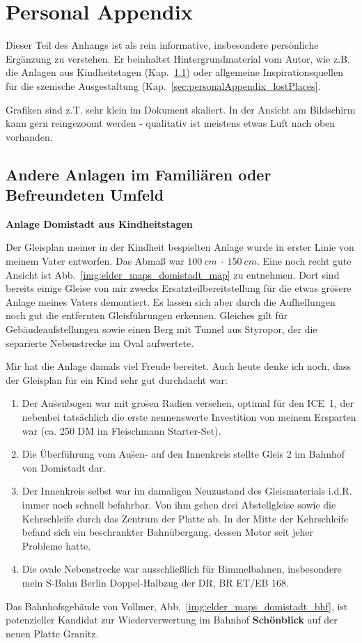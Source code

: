 \section{Personal Appendix}
\label{sec:personalAppendix}

Dieser Teil des Anhangs ist als rein informative, insbesondere pers\"onliche Erg\"anzung zu verstehen.
Er beinhaltet Hintergrundmaterial vom Autor, wie z.B. die Anlagen aus Kindheitstagen (Kap.~\ref{sec:personalAppendix_elderTracks}) oder allgemeine Inspirationsquellen f\"ur die szenische Ausgestaltung (Kap.~\ref{sec:personalAppendix_lostPlaces}.

Grafiken sind z.T. sehr klein im Dokument skaliert.
In der Ansicht am Bildschirm kann gern reingezoomt werden - qualitativ ist meistens etwas Luft nach oben vorhanden.


\subsection{Andere Anlagen im Famili\"aren oder Befreundeten Umfeld}
\label{sec:personalAppendix_elderTracks}

\textbf{Anlage Domistadt aus Kindheitstagen}

Der Gleisplan meiner in der Kindheit bespielten Anlage wurde in erster Linie von meinem Vater entworfen.
Das Abma{\ss} war $100~cm~\cdot~150~cm$.
Eine noch recht gute Ansicht ist Abb.~\ref{img:elder_maps_domistadt_map} zu entnehmen.
Dort sind bereits einige Gleise von mir zwecks Ersatzteilbereitstellung f\"ur die etwas gr\"o\"sere Anlage meines Vaters demontiert.
Es lassen sich aber durch die Aufhellungen noch gut die entfernten Gleisf\"uhrungen erkennen.
Gleiches gilt f\"ur Geb\"audeaufstellungen sowie einen Berg mit Tunnel aus Styropor, der die separierte Nebenstrecke im Oval aufwertete.

Mir hat die Anlage damals viel Freude bereitet.
Auch heute denke ich noch, dass der Gleisplan f\"ur ein Kind sehr gut durchdacht war:
\begin{enumerate}
	\item Der Au\"senbogen war mit gro\"sen Radien versehen, optimal f\"ur den ICE~1, der nebenbei tats\"achlich die erste nennenswerte Investition von meinem Ersparten war (ca. 250 DM im Fleischmann Starter-Set).
	\item Die \"Uberf\"uhrung vom Au\"sen- auf den Innenkreis stellte Gleis 2 im Bahnhof von Domistadt dar.
	\item Der Innenkreis selbst war im damaligen Neuzustand des Gleismaterials i.d.R. immer noch schnell befahrbar.
	Von ihm gehen drei Abstellgleise sowie die Kehrschleife durch das Zentrum der Platte ab.
	In der Mitte der Kehrschleife befand sich ein beschrankter Bahn\"ubergang, dessen Motor seit jeher Probleme hatte.
	\item Die ovale Nebenstrecke war ausschlie{\ss}lich f\"ur Bimmelbahnen, insbesondere mein S-Bahn Berlin Doppel-Halbzug der DR, BR ET/EB 168.
\end{enumerate}
Das Bahnhofsgeb\"aude von Vollmer, Abb.~\ref{img:elder_maps_domistadt_bhf}, ist potenzieller Kandidat zur Wiederverwertung im Bahnhof \textbf{Sch\"onblick} auf der neuen Platte Granitz.

